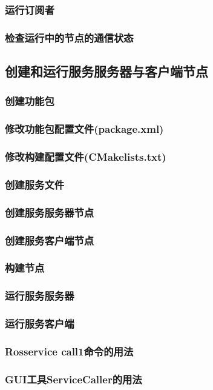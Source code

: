 \documentclass[geye,green,kindle,cn]{elegantnote}
\begin{document}
\subsubsection{运行订阅者}
\subsubsection{检查运行中的节点的通信状态}
\subsection{创建和运行服务服务器与客户端节点}
\subsubsection{创建功能包}
\subsubsection{修改功能包配置文件(package.xml)}
\subsubsection{修改构建配置文件(CMakelists.txt)}
\subsubsection{创建服务文件}
\subsubsection{创建服务服务器节点}
\subsubsection{创建服务客户端节点}
\subsubsection{构建节点}
\subsubsection{运行服务服务器}
\subsubsection{运行服务客户端}
\subsubsection{Rosservice call1命令的用法}
\subsubsection{GUI工具ServiceCaller的用法}
\end{document}
